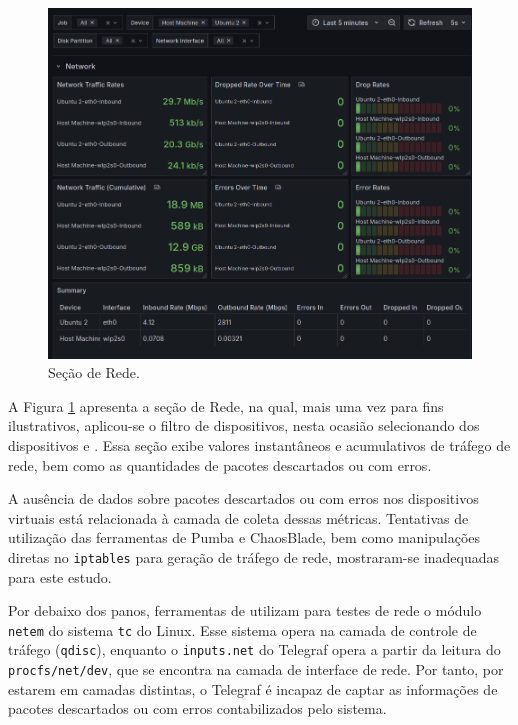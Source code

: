 \begin{figure}[H]
\centering
\setlength{\abovecaptionskip}{-20pt}
\includegraphics[width=\textwidth]{Imagens/chap04/dashboard/network.png}
\caption{Seção de Rede.}
\label{fig:dashboard-network}
\end{figure}

A Figura \ref{fig:dashboard-network} apresenta a seção de Rede, na qual, mais uma vez para fins ilustrativos, aplicou-se o filtro de dispositivos, nesta ocasião selecionando dos dispositivos  e . Essa seção exibe valores instantâneos e acumulativos de tráfego de rede, bem como as quantidades de pacotes descartados ou com erros.

A ausência de dados sobre pacotes descartados ou com erros nos dispositivos virtuais está relacionada à camada de coleta dessas métricas. Tentativas de utilização das ferramentas de  Pumba e ChaosBlade, bem como manipulações diretas no \verb|iptables| para geração de tráfego de rede, mostraram-se inadequadas para este estudo.

Por debaixo dos panos, ferramentas de  utilizam para testes de rede o módulo \verb|netem| do sistema \verb|tc| do Linux. Esse sistema opera na camada de controle de tráfego (\verb|qdisc|), enquanto o  \verb|inputs.net| do Telegraf opera a partir da leitura do \verb|procfs/net/dev|, que se encontra na camada de interface de rede. Por tanto, por estarem em camadas distintas, o Telegraf é incapaz de captar as informações de pacotes descartados ou com erros contabilizados pelo sistema.

